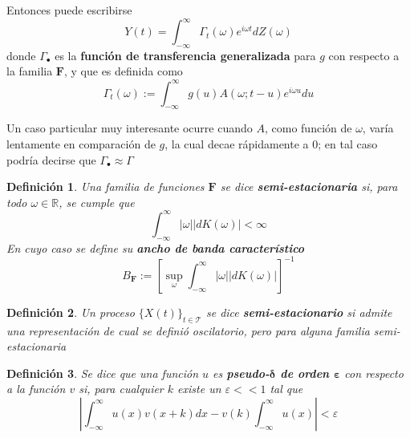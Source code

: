 \documentclass[12pt,letterpaper]{book}
\newtheorem{definicion}{Definición}[chapter]
\newcommand{\R}{\mathbb{R}}
\newcommand{\intR}{\int_{-\infty}^{\infty}}
\newcommand{\ef}{\mathbf{F}}
\newcommand{\abso}[1]{\left| #1 \right|}
\newcommand{\xt}{$\{X(t)\}_{t\in \mathcal{T}}$ }
\begin{document}
Entonces puede escribirse 
\begin{equation}
Y(t) = \intR \Gamma_t(\omega) e^{i \omega t} dZ(\omega) 
\label{se6:filtrado}
\end{equation}
donde $\Gamma_\bullet$ es la \textbf{función de transferencia generalizada} para $g$ con respecto a la familia $\ef$, y que es definida como
\begin{equation}
\Gamma_t (\omega) := \intR g(u) A(\omega; t-u) e^{i \omega u} du
\label{se6:trans_general}
\end{equation}

Un caso particular muy interesante ocurre cuando $A$, como función de $\omega$, varía lentamente en comparación de $g$, la cual decae rápidamente a 0; en tal caso podría decirse que $\Gamma_\bullet \approx \Gamma$

\begin{definicion}
Una familia de funciones $\ef$ se dice \textbf{semi-estacionaria} si, para todo $\omega \in \R$, se cumple que
\begin{equation}
\intR \abso{\omega} \abso{dK(\omega)} < \infty
\end{equation}
En cuyo caso se define su \textbf{ancho de banda característico}
\begin{equation}
B_\ef := \left[ \sup_\omega \intR \abso{\omega} \abso{dK(\omega)} \right]^{-1}
\end{equation}
\end{definicion}

\begin{definicion}
Un proceso \xt se dice \textbf{semi-estacionario} si admite una representación de cual se definió oscilatorio, pero para alguna familia semi-estacionaria
\end{definicion}


\begin{definicion}
Se dice que una función $u$ es 
\textbf{pseudo-$\boldsymbol{\delta}$ de orden $\boldsymbol{\varepsilon}$} con respecto a la función $v$ si, para cualquier $k$ existe un $\varepsilon << 1$ tal que 
\begin{equation}
\abso{\intR u(x) v(x+k) dx  -  v(k)\intR u(x)} < \varepsilon
\end{equation}
\end{definicion}
\end{document}

